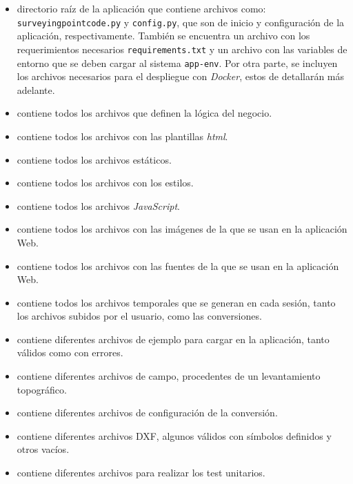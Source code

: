 \begin{itemize}

\item {} directorio raíz de la aplicación que contiene archivos como: \texttt{surveyingpointcode.py} y \texttt{config.py}, que son de inicio y configuración de la aplicación, respectivamente. También se encuentra un archivo con los requerimientos necesarios \texttt{requirements.txt} y un archivo con las variables de entorno que se deben cargar al sistema \texttt{app-env}. Por otra parte, se incluyen los archivos necesarios para el despliegue con \emph{Docker}, estos de detallarán más adelante.

\item {} contiene todos los archivos que definen la lógica del negocio. 

\item {} contiene todos los archivos con las plantillas \emph{ html}. 

\item {} contiene todos los archivos estáticos.

\item {} contiene todos los archivos con los estilos.

\item {} contiene todos los archivos \emph{JavaScript}.

\item {} contiene todos los archivos con las imágenes de la que se usan en la aplicación Web.

\item {} contiene todos los archivos con las fuentes de la que se usan en la aplicación Web.

\item {} contiene todos los archivos temporales que se generan en cada sesión, tanto los archivos subidos por el usuario, como las conversiones.

\item {} contiene diferentes archivos de ejemplo para cargar en la aplicación, tanto válidos como con errores.

\item {} contiene diferentes archivos de campo, procedentes de un levantamiento topográfico.

\item {} contiene diferentes archivos de configuración de la conversión.

\item {} contiene diferentes archivos DXF, algunos válidos con símbolos definidos y otros vacíos.

\item {} contiene diferentes archivos para realizar los test unitarios.

\end{itemize}


